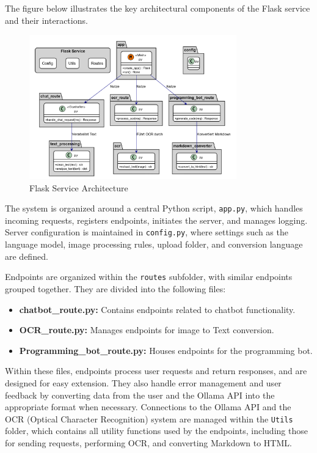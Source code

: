 The figure below illustrates the key architectural components of the Flask service and their interactions.
\begin{figure}[h]
    \centering
    \includegraphics[width=0.8\textwidth]{figures/flask_service.png}
    \caption{Flask Service Architecture}
    \label{fig:flask_service_architecture}
\end{figure}

The system is organized around a central Python script, \texttt{app.py}, which handles incoming requests, registers endpoints, initiates the server, and manages logging. Server configuration is maintained in \texttt{config.py}, where settings such as the language model, image processing rules, upload folder, and conversion language are defined.

Endpoints are organized within the \texttt{routes} subfolder, with similar endpoints grouped together. They are divided into the following files:
\begin{itemize}
    \item \textbf{chatbot\_route.py:} Contains endpoints related to chatbot functionality.
    \item \textbf{OCR\_route.py:} Manages endpoints for image to Text conversion.
    \item \textbf{Programming\_bot\_route.py:} Houses endpoints for the programming bot.
\end{itemize}

Within these files, endpoints process user requests and return responses, and are designed for easy extension. They also handle error management and user feedback by converting data from the user and the Ollama API into the appropriate format when necessary. Connections to the Ollama API and the OCR (Optical Character Recognition) system are managed within the \texttt{Utils} folder, which contains all utility functions used by the endpoints, including those for sending requests, performing OCR, and converting Markdown to HTML.

